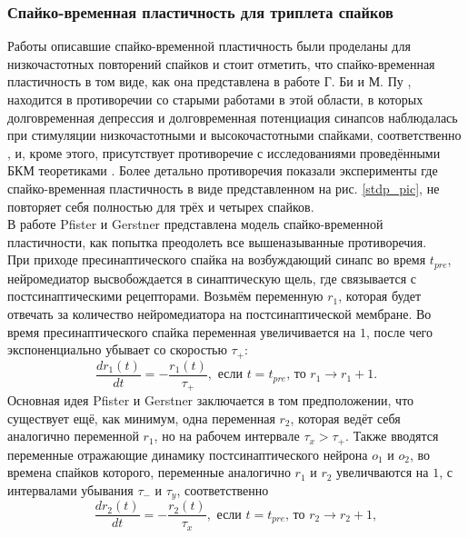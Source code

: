 \documentclass[a4paper,10pt]{article}
\begin{document}
\subsubsection{Спайко-временная пластичность для триплета спайков}
\indent Работы описавшие спайко-временной пластичность были проделаны для низкочастотных повторений спайков и стоит отметить, что спайко-временная пластичность в том виде, как она представлена в работе Г. Би и М. Пу \cite{stdp4}, находится в противоречии со старыми работами в этой области, в которых долговременная депрессия и долговременная потенциация синапсов наблюдалась при стимуляции низкочастотными и высокочастотными спайками, соответственно \cite{caporale2008spike}, и, кроме этого, присутствует противоречие с исследованиями проведёнными БКМ теоретиками \cite{Cooper}. Более детально противоречия показали эксперименты \cite{bi2002temporal,froemke2002spike,wang2005coactivation} где спайко-временная пластичность в виде представленном на рис. \ref{stdp_pic}, не повторяет себя полностью для трёх и четырех спайков.\\
\indent В работе Pfister и Gerstner \cite{PfisterTriple} представлена модель спайко-временной пластичности, как попытка преодолеть все вышеназыванные противоречия.\\
\indent При приходе пресинаптического спайка на возбуждающий синапс во время $t_{pre}$, нейромедиатор высвобождается в синаптическую щель, где связывается с постсинаптическими рецепторами. Возьмём переменную $r_{1}$, которая будет отвечать за количество нейромедиатора на постсинаптической мембране. Во время пресинаптического спайка переменная увеличивается на $1$, после чего экспоненциально убывает со скоростью $\tau_{+}$:
\begin{equation*}
\frac{dr_{1}(t)}{dt} = -\frac{r_{1}(t)}{\tau_{+}}, \mbox{ если } t=t_{pre}\mbox{, то }r_{1} \rightarrow r_{1} + 1.
\end{equation*}
\indent Основная идея Pfister и Gerstner заключается в том предположении, что существует ещё, как минимум, одна переменная $r_{2}$, которая ведёт себя аналогично переменной $r_{1}$, но на рабочем интервале $\tau_{x}>\tau_{+}$. Также вводятся переменные отражающие динамику постсинаптического нейрона $o_{1}$ и $o_{2}$, во времена спайков которого, переменные аналогично $r_{1}$ и $r_{2}$ увеличваются на $1$, с интервалами убывания $\tau_{-}$ и $\tau_{y}$, соответственно
\begin{equation*}
\frac{dr_{2}(t)}{dt} = -\frac{r_{2}(t)}{\tau_{x}}, \mbox{ если } t=t_{pre}\mbox{, то }r_{2} \rightarrow r_{2} + 1,
\end{equation*}
\end{document}
